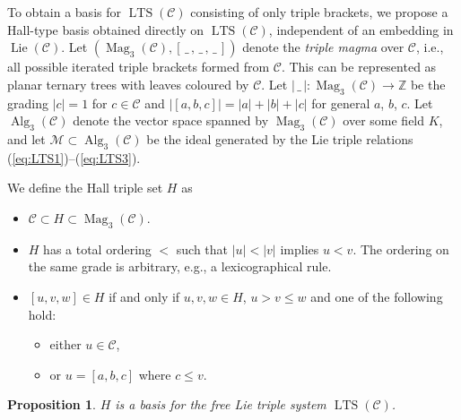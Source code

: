 \documentclass[10pt,a4paper]{amsart}
\newcommand{\ZZ}{\ensuremath{\mathbb{Z}}}
\newcommand{\refp}[1]{(\ref{#1})}
\newcommand*{\LTS}{\operatorname{LTS}}
\newcommand*{\Lie}{\operatorname{Lie}}
\newcommand*{\Mag}{\operatorname{Mag}}
\newcommand*{\Alg}{\operatorname{Alg}}
\newcommand{\noarg}{\,\_\,}
\numberwithin{equation}{section}
\newtheorem{Proposition}[Theorem]{Proposition}
 { \theoremstyle{definition}
\newtheorem{Definition}[Theorem]{Definition}
\newtheorem{Note}[Theorem]{Note}
\newtheorem{Example}[Theorem]{Example}
\newtheorem{Remark}[Theorem]{Remark} }
\begin{document}
To obtain a basis for $\LTS(\mathcal{C})$ consisting of only triple brackets, we propose a Hall-type basis obtained directly on $\LTS(\mathcal{C})$, independent of an embedding in $\Lie(\mathcal{C})$. Let $(\Mag_3(\mathcal{C}),[\noarg,\noarg,\noarg])$ denote the \emph{triple magma} over $\mathcal{C}$, i.e., all possible iterated triple brackets formed from $\mathcal{C}$. This can be represented as planar ternary trees with leaves coloured by $\mathcal{C}$. Let $|\noarg|\colon\Mag_3(\mathcal{C})\rightarrow \ZZ$ be the grading $|c|=1$ for $c\in \mathcal{C}$ and $|[a,b,c]| = |a|+|b|+|c|$ for general $a$, $b$, $c$. Let $\Alg_3(\mathcal{C})$ denote the vector space spanned by $\Mag_3(\mathcal{C})$ over some field $K$, and let $\mathcal{M} \subset \Alg_3(\mathcal{C})$ be the ideal generated by the Lie triple relations \refp{eq:LTS1}--\refp{eq:LTS3}.

\begin{Definition}\label{def:H3}
We define the Hall triple set $H$ as
\begin{itemize}\itemsep=0pt
\item $\mathcal{C}\subset H\subset \Mag_3(\mathcal{C})$.
\item $H$ has a total ordering $<$ such that $|u|<|v|$ implies $u<v$. The ordering on the same grade is arbitrary, e.g., a lexicographical rule.
\item $[u,v,w]\in H$ if and only if $u,v,w\in H$, $u>v\leq w$ and one of the following hold:
\begin{itemize}\itemsep=0pt
 \item either $u\in \mathcal{C}$,
 \item or $u = [a,b,c]$ where $c\leq v$.
\end{itemize}
\end{itemize}
\end{Definition}

\begin{Proposition}\label{prop:LTS_Hall}
$H$ is a basis for the free Lie triple system $\LTS(\mathcal{C})$.
\end{Proposition}
\end{document}
